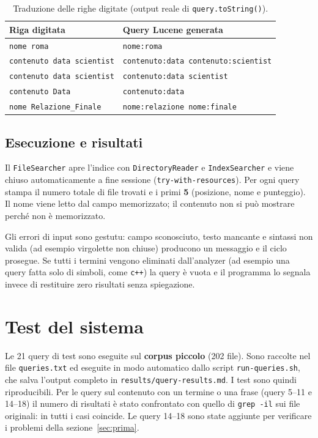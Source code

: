 \documentclass[11pt,a4paper]{article}
\newcommand{\dq}{\textquotedbl}            %
\newcommand{\code}[1]{\texttt{#1}}
\begin{document}
\begin{table}[!htbp]
\centering
\begin{tabular}{@{}ll@{}}
\toprule
\textbf{Riga digitata} & \textbf{Query Lucene generata} \\
\midrule
\code{nome roma} & \code{nome:roma} \\
\code{contenuto data scientist} & \code{contenuto:data contenuto:scientist} \\
\code{contenuto \dq{}data scientist\dq} & \code{contenuto:\dq{}data scientist\dq} \\
\code{contenuto Data} & \code{contenuto:data} \\
\code{nome Relazione\_Finale} & \code{nome:relazione nome:finale} \\
\bottomrule
\end{tabular}
\caption{Traduzione delle righe digitate (output reale di \code{query.toString()}).}
\label{tab:parsing}
\end{table}

\subsection{Esecuzione e risultati}

Il \code{FileSearcher} apre l'indice con \code{DirectoryReader} e
\code{IndexSearcher} e viene chiuso automaticamente a fine sessione
(\code{try-with-resources}). Per ogni query stampa il numero totale di file
trovati e i primi \textbf{5} (posizione, nome e punteggio). Il nome viene letto
dal campo memorizzato; il contenuto non si può mostrare perché non è memorizzato.

Gli errori di input sono gestutu: campo sconosciuto, testo
mancante e sintassi non valida (ad esempio virgolette non chiuse) producono un
messaggio e il ciclo prosegue. Se tutti i termini vengono eliminati
dall'analyzer (ad esempio una query fatta solo di simboli, come \code{c++}) la
query è vuota e il programma lo segnala invece di restituire zero risultati senza
spiegazione.

\section{Test del sistema}
\label{sec:test}

Le 21 query di test sono eseguite sul \textbf{corpus piccolo} (202 file). Sono
raccolte nel file \code{queries.txt} ed eseguite in modo
automatico dallo script \code{run-queries.sh}, che salva l'output completo in
\code{results/query-results.md}. I test sono quindi riproducibili. Per le query sul
contenuto con un termine o una frase (query 5--11 e 14--18) il numero di risultati è
stato confrontato con quello di \code{grep -il} sui file originali: in tutti i casi
coincide. Le query 14--18 sono state aggiunte per verificare i problemi della
sezione~\ref{sec:prima}.
\end{document}

